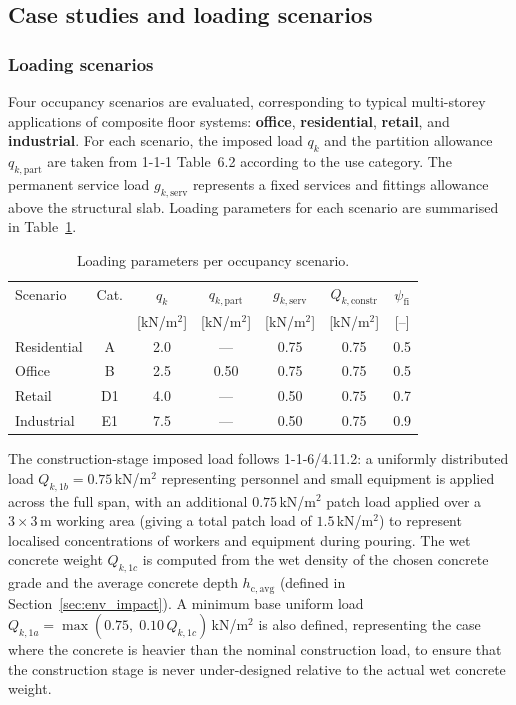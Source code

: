 \subsection{Case studies and loading scenarios}
\label{sec:casestudies}
\subsubsection*{Loading scenarios}

Four occupancy scenarios are evaluated, corresponding to typical multi-storey applications of composite floor systems: \textbf{office}, \textbf{residential}, \textbf{retail}, and \textbf{industrial}. For each scenario, the imposed load $q_k$ and the partition allowance $q_{k,\mathrm{part}}$ are taken from 1-1-1 Table~6.2 according to the use category. The permanent service load $g_{k,\mathrm{serv}}$ represents a fixed services and fittings allowance above the structural slab. Loading parameters for each scenario are summarised in Table~\ref{tab:loading_scenarios}.

\begin{table}[h!]
\small
\centering
\caption{Loading parameters per occupancy scenario.}
\label{tab:loading_scenarios}
\begin{tabular}{lcccccc}
\toprule
Scenario & Cat. & $q_k$ & $q_{k,\mathrm{part}}$ & $g_{k,\mathrm{serv}}$ & $Q_{k,\mathrm{constr}}$ & $\psi_\mathrm{fi}$ \\
         &      & [kN/m$^2$] & [kN/m$^2$] & [kN/m$^2$] & [kN/m$^2$] & [--] \\
\midrule
Residential & A  & 2.0 & ---  & 0.75 & 0.75 & 0.5 \\
Office      & B  & 2.5 & 0.50 & 0.75 & 0.75 & 0.5 \\
Retail      & D1 & 4.0 & ---  & 0.50 & 0.75 & 0.7 \\
Industrial  & E1 & 7.5 & ---  & 0.50 & 0.75 & 0.9 \\
\bottomrule
\end{tabular}
\end{table}

The construction-stage imposed load follows 1-1-6/4.11.2: a uniformly distributed load $Q_{k,1b} = 0.75$\,kN/m$^2$ representing personnel and small equipment is applied across the full span, with an additional $0.75$\,kN/m$^2$ patch load applied over a $3 \times 3$\,m working area (giving a total patch load of $1.5$\,kN/m$^2$) to represent localised concentrations of workers and equipment during pouring. The wet concrete weight $Q_{k,1c}$ is computed from the wet density of the chosen concrete grade and the average concrete depth $h_\mathrm{c,avg}$ (defined in Section~\ref{sec:env_impact}). A minimum base uniform load $Q_{k,1a} = \max(0.75,\;0.10\,Q_{k,1c})$\,kN/m$^2$ is also defined, representing the case where the concrete is heavier than the nominal construction load, to ensure that the construction stage is never under-designed relative to the actual wet concrete weight.

